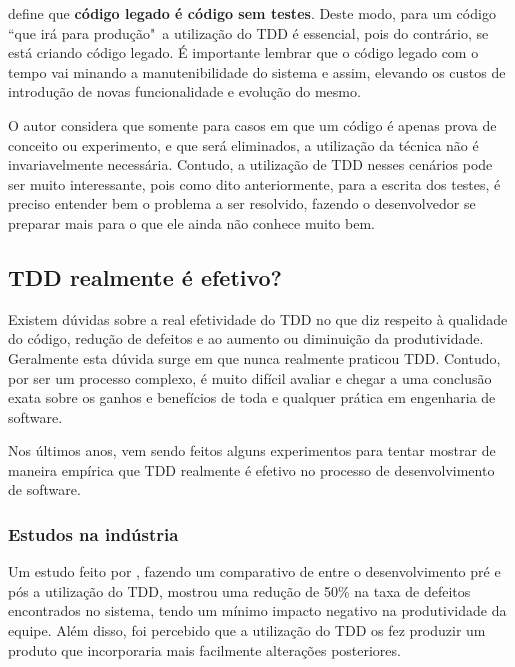  define que \textbf{código legado é código sem testes}. Deste modo, para um código ``que irá para produção"\ a utilização do TDD é essencial, pois do contrário, se está criando código legado. É importante lembrar que o código legado com o tempo vai minando a manutenibilidade do sistema e assim, elevando os custos de introdução de novas funcionalidade e evolução do mesmo.

O autor considera que somente para casos em que um código é apenas prova de conceito ou experimento, e que será eliminados, a utilização da técnica não é invariavelmente necessária. Contudo, a utilização de TDD nesses cenários pode ser muito interessante, pois como dito anteriormente, para a escrita dos testes, é preciso entender bem o problema a ser resolvido, fazendo o desenvolvedor se preparar mais para o que ele ainda não conhece muito bem.


\subsection{TDD realmente é efetivo?} %
\label{sub:tdd_realmente_e_efetivo}

Existem dúvidas sobre a real efetividade do TDD no que diz respeito à qualidade do código, redução de defeitos e ao aumento ou diminuição da produtividade. Geralmente esta dúvida surge em que nunca realmente praticou TDD. Contudo, por ser um processo complexo, é muito difícil avaliar e chegar a uma conclusão exata sobre os ganhos e benefícios de toda e qualquer prática em engenharia de software.

Nos últimos anos, vem sendo feitos alguns experimentos para tentar mostrar de maneira empírica que TDD realmente é efetivo no processo de desenvolvimento de software.

\subsubsection{Estudos na indústria} %
\label{sub:estudos_na_industria}

Um estudo feito por , fazendo um comparativo de entre o desenvolvimento pré e pós a utilização do TDD, mostrou uma redução de 50\% na taxa de defeitos encontrados no sistema, tendo um mínimo impacto negativo na produtividade da equipe. Além disso, foi percebido que a utilização do TDD os fez produzir um produto que incorporaria mais facilmente alterações posteriores.

